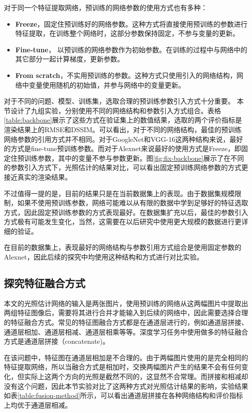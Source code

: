 
对于同一个特征提取网络，预训练的网络参数的使用方式也有多种：
\begin{itemize}
    \item \textbf{Freeze}，固定住预训练好的网络参数。这种方式将直接使用预训练的参数进行特征提取，在训练整个网络时，这部分参数保持固定，不参与变量的更新。
    \item \textbf{Fine-tune}， 以预训练的网络参数作为初始参数。在训练的过程中与网络中的其它部分一起计算梯度，更新参数。
    \item \textbf{From scratch}，不实用预训练的参数。这种方式只使用引入的网络结构，网络中变量使用随机的初始值，并参与网络中的变量更新。
\end{itemize}

对于不同的问题、模型、训练集，选取合理的预训练参数引入方式十分重要。
本节设计了九组实验，分别使用不同的网络结构和参数引入方式组合。表格\ref{table:backbone}展示了这些方式在验证集上的数值结果，选取的两个评价指标是渲染结果上的RMSE和DSSIM。可以看出，对于不同的网络结构，最佳的预训练网络参数的引用方式并不相同。对于GoogleNet和VGG-16这两种结构来说，最好的方式是fine-tune预训练参数。而对于Alexnet来说最好的使用方式是Freeze，即固定住预训练参数，其中的变量不参与参数更新。图\ref{fig:fix-backbone}展示了在不同的参数引入方式下，光照估计的结果对比，可以看出固定预训练网络参数的方式更接近真实的渲染结果。


不过值得一提的是，目前的结果只是在当前数据集上的表现。由于数据集规模限制，如果不使用预训练参数，网络可能难以从有限的数据中学到足够好的特征选取方式，因此固定预训练参数的方式表现最好。在数据集扩充以后，最佳的参数引入方式极有可能发生变化，当然，这需要在以后研究中使用更大规模的数据进行更详细的验证。

在目前的数据集上，表现最好的网络结构与参数引用方式组合是使用固定参数的Alexnet，因此后续的探究中均使用这种结构和方式进行对比实验。
\subsection{探究特征融合方式}

本文的光照估计网络的输入是两张图片，使用预训练的网络从这两幅图片中提取出两组特征图像后，需要将其进行合并才能输入到后续的网络中，因此需要选择合理的特征融合方式。常见的特征图融合方式都是在通道层进行的，例如通道层拼接、通道层相加、通道层相减、通道层相乘等等。深度学习任务中使用做多的特征融合方式是通道层拼接（concatenate)。

在该问题中，特征图在通道层相加是不合理的。由于两幅图片使用的是完全相同的特征提取网络，所以当融合方式是相加时，交换两幅图片产生的结果不会有任何变化，但实际上这两个方向的光照是截然不同的，这显然不合常理。而拼接和相减却没有这个问题，因此本节实验对比了这两种方式对光照估计结果的影响，实验结果如表\ref{table:fusion-method}所示，可以看出通道层拼接在各种网络结构和评价指标上均优于通道层相减。


